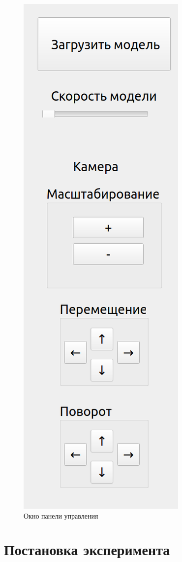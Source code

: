 \begin{figure}[H]
	\begin{center}
		\includegraphics[scale=0.3]{img/control-panel.png}
	\end{center}
	\captionsetup{justification=centering}
	\caption{Окно панели управления}
	\label{img:control-panel}
\end{figure}

\section{Постановка эксперимента}